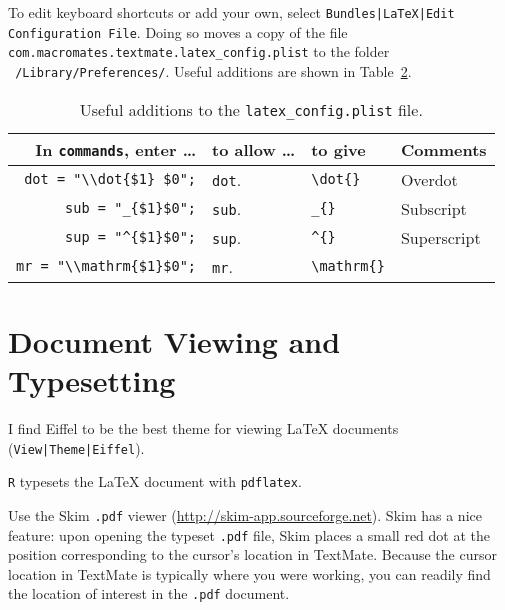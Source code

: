\documentclass[10pt]{article}
\begin{document}
\begin{table}
\begin{tabular}{r|l|l}
\end{tabular}
\label{tab:keyboard_shortcuts}
\end{table}

To edit keyboard shortcuts or add your own, select
\texttt{Bundles|LaTeX|Edit Configuration File}. 
Doing so moves a copy of the file 
\verb!com.macromates.textmate.latex_config.plist!
to the folder
\texttt{~/Library/Preferences/}.
Useful additions are shown in Table~\ref{tab:additions_to_plist}.

\begin{table}
\centering
\caption{Useful additions to the \texttt{latex\_config.plist} file.}
\begin{tabular}{r|l|l|l}
	In \texttt{commands}, enter \dots & to allow \dots      & to give              & Comments \\
	\hline
	\verb!dot = "\\dot{$1} $0";!   & \texttt{dot}\cmdkey\shiftkey. & \verb!\dot{}! & Overdot \\
	\verb!sub = "_{$1}$0";!        & \texttt{sub}\cmdkey\shiftkey. & \verb!_{}!    & Subscript \\
	\verb!sup = "^{$1}$0";!        & \texttt{sup}\cmdkey\shiftkey. & \verb!^{}!    & Superscript \\
	\verb!mr = "\\mathrm{$1}$0";!  & \texttt{mr}\cmdkey\shiftkey.  & \verb!\mathrm{}! & \\
\end{tabular}
\label{tab:additions_to_plist}
\end{table}



\section{Document Viewing and Typesetting} %
\label{sec:document_viewing_and_typesetting}
I find Eiffel to be the best theme for viewing \LaTeX{} documents
(\texttt{View|Theme|Eiffel}). 

\cmdkey\texttt{R} typesets the \LaTeX{} document with \texttt{pdflatex}. 

Use the Skim \texttt{.pdf} viewer (\url{http://skim-app.sourceforge.net}).
Skim has a nice feature: upon opening the typeset \texttt{.pdf} file,
Skim places a small red dot at the position corresponding to the cursor's 
location in TextMate. 
Because the cursor location in TextMate is typically where you were working,
you can readily find the location of interest in the \texttt{.pdf} document.
\end{document}
